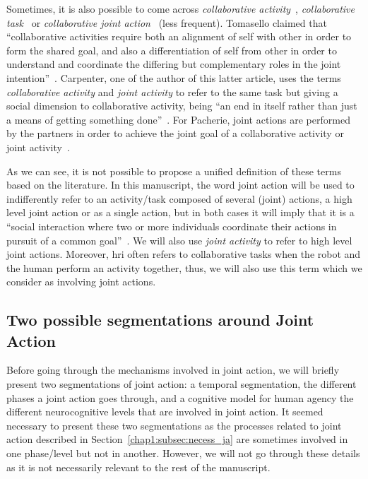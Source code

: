 \documentclass[a4paper,11pt,twoside]{StyleThese}
\begin{document}
Sometimes, it is also possible to come across \emph{collaborative activity}~\cite{tomasello_2005_understanding}, \emph{collaborative task}~\cite{brennan_2008_coordinating} or \emph{collaborative joint action}~\cite{godman_2013_we} (less frequent). Tomasello \etal{} claimed that ``collaborative activities require both an alignment of self with other in order to form the shared goal, and also a differentiation of self from other in order to understand and coordinate the differing but complementary roles in the joint intention''~\cite[p.~681]{tomasello_2005_understanding}. Carpenter, one of the author of this latter article, uses the terms \emph{collaborative activity} and \emph{joint activity} to refer to the same task but giving a social dimension to collaborative activity, being ``an end in itself rather than just a means of getting something done''~\cite[p.~384]{carpenter_2009_just}. For Pacherie, joint actions are performed by the partners in order to achieve the joint goal of a collaborative activity or joint activity~\cite{pacherie_2013_intentional}.

As we can see, it is not possible to propose a unified definition of these terms based on the literature. In this manuscript, the word joint action will be used to indifferently refer to an activity/task composed of several (joint) actions, \ie a high level joint action or as a single action, but in both cases it will imply that it is a ``social interaction where two or more individuals coordinate their actions in pursuit of a common goal''~\cite{castro_2020_joint}. We will also use \textit{joint activity} to refer to high level joint actions. Moreover, \acrshort{hri} often refers to collaborative tasks when the robot and the human perform an activity together, thus, we will also use this term which we consider as involving joint actions.

\subsection{Two possible segmentations around Joint Action}

Before going through the mechanisms involved in joint action, we will briefly present two segmentations of joint action: a temporal segmentation, \ie the different phases a joint action goes through, and a cognitive model for human agency \ie the different neurocognitive levels that are involved in joint action. It seemed necessary to present these two segmentations as the processes related to joint action described in Section~\ref{chap1:subsec:necess_ja} are sometimes involved in one phase/level but not in another. However, we will not go through these details as it is not necessarily relevant to the rest of the manuscript.
\end{document}
